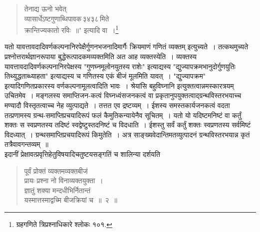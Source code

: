 \documentclass[11pt, openany]{book}
\begin{document}
\begin{quote}
{ \vspace{-7mm}
\hspace{1cm} तेनाद्य ऊनो भवेत् \\
 
 \vspace{-7mm}
 व्यासार्धेऽष्टगुणाब्धिपावक\textendash \,३४३८\textendash \,मिते \\
 
 \vspace{-7mm}
\hspace{1cm} क्रान्तिज्यकातो रविः~॥"} इत्यादि वा~।\renewcommand{\thefootnote}{$\ddag$}\footnote{ग्रहगणिते त्रिप्रश्नाधिकारे श्लोकः १०१.}
\end{quote}
\newpage

 यतो यावत्तावदादिवर्णकल्पनानिरपेक्षैर्गुणनभजनादिमार्गैः क्रियमाणं गणितं
व्यक्तम् इत्युच्यते~। तत्कथमुच्यते प्रश्नोत्तरार्थज्ञानरूपाया
बुद्धेरूत्पादकमव्यक्तमिति अत 
आह व्यक्तस्येति~। व्यक्तस्य यावत्तावदादिवर्णकल्पनानिरपेक्षस्य {\qt "गुणघ्नमूलोनयुतस्य राशेः"} इत्याद्यस्य {\qt "द्युज्यापक्रमभानुदोर्गुणयुतिः
तिथ्युद्धताब्ध्याहता"}  इत्याद्यस्य च गणितस्य एकं बीजं मूलमिति यावत्~। {\qt "द्युज्यापक्रम"}  इत्यादिगणितप्रकारस्य वर्णकल्पनामूलत्वादिति भावः~। श्रेयांसि बहुविघ्नानि इत्युक्तत्वान्नमस्कारत्रयम् उचितमेव~। मङ्गलस्य समाप्तिजन-कत्वं विघ्नध्वंसजनकत्वं वा प्रकृतानुपयुक्तत्वाद्ग्रन्थविस्तरभयाच्च मण्यादौ विस्तृतत्वाच्च नेह व्युत्पाद्यते~। तत्तत एव द्रष्टव्यम्~। ईशस्य समस्तकार्यजनकत्वं वदता तत्प्रणामस्य
ग्रन्थ-समाप्तिप्रचयादिरूपं फलं कैमुतिकन्यायेनैव सूचितम्~। यतो यो यदिष्टमनिष्टं वा कर्तुं शक्तः स स्वप्रणतस्य तदिष्टं स्वद्वेष्टुस्तदनिष्टं च विदधाति~। ईशस्तु
सर्वं कर्तुं शक्तः स्वप्रणतस्य सर्वमिष्टं विदध्यात्~। ग्रन्थसमाप्तिप्रचयादिरूपं किमुतेति~। अत्र साङ्ख्यवेदान्तिमतव्युत्पादनं ग्रन्थविस्तरभयान्न कृतं तत्रैवावगन्तव्यम्~॥ \\

\vspace{-3mm}
 इदानीं प्रेक्षावत्प्रवृत्तिहेतुविषयादिचतुष्टयसङ्गतिं च शालिन्या
दर्शयति\textendash 

 \label{1.2}
\begin{quote}
    \bs
 पूर्वं प्रोक्तं व्यक्तमव्यक्तबीजं \\

\vspace{-7mm}
\hspace{0.5cm} प्रायः प्रश्ना नो विनाव्यक्तयुक्ता~। \\
 
  \vspace{-7mm}
 ज्ञातुं शक्या मन्दधीभिर्नितान्तं \\

\vspace{-7mm}
\hspace{0.5cm} यस्मात्तस्माद्वच्मि बीजक्रियां च~॥~२~॥
\end{quote}
\end{document}
